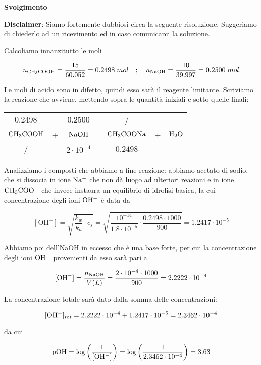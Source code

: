\vspace{0.2cm}\large\textbf{Svolgimento}\normalsize

\vspace{0.2cm}\textbf{Disclaimer}: Siamo fortemente dubbiosi circa la seguente risoluzione. Suggeriamo di chiederlo ad un ricevimento ed in caso comunicarci la soluzione.

\vspace{0.2cm}Calcoliamo innanzitutto le moli

$$n_{\rm CH_3COOH}=\frac{15}{60.052}=0.2498\;mol
\quad;\quad
n_{\rm NaOH}=\frac{10}{39.997}=0.2500\;mol$$

Le moli di acido sono in difetto, quindi esso sarà il reagente limitante. Scriviamo la reazione che avviene, mettendo sopra le quantità iniziali e sotto quelle finali:

\begin{center}
    \begin{tabular}{ccccccc}
        $0.2498$ &  & $0.2500$ & & / &&\\
        $\rm CH_3COOH$ & + & $\rm NaOH$ & \ce{->} & $\rm CH_3COONa$ & + & $\rm H_2O$\\
        / &  & $2 \cdot 10^{-4}$ & & $0.2498$ &&\\
    \end{tabular}
\end{center}

Analizziamo i composti che abbiamo a fine reazione: abbiamo acetato di sodio, che si dissocia in ione $\rm Na^+$ che non dà luogo ad ulteriori reazioni e in ione $\rm CH_3COO^-$ che invece instaura un equilibrio di idrolisi basica, la cui concentrazione degli ioni $\rm OH^-$ è data da

$$[\text{OH}^-]
=\sqrt{\frac{k_w}{k_a}\cdot c_s}
=\sqrt{\frac{10^{-14}}{1.8 \cdot 10^{-5}} \cdot \frac{0.2498 \cdot 1000}{900}}
=1.2417 \cdot 10^{-5}$$

Abbiamo poi dell'NaOH in eccesso che è una base forte, per cui la concentrazione degli ioni $\rm OH^-$ provenienti da esso sarà pari a

$$[\text{OH}^-]=\frac{n_{\rm NaOH}}{V(L)}
=\frac{2 \cdot 10^{-4} \cdot 1000}{900}=2.2222 \cdot 10^{-4}$$

La concentrazione totale sarà dato dalla somma delle concentrazioni:

$$\rm [OH^-]_{\textit{tot}}=2.2222 \cdot 10^{-4} + 1.2417 \cdot 10^{-5}
=2.3462 \cdot 10^{-4}$$

da cui

$$\rm pOH=\log{\left(\frac{1}{[OH^-]}\right)}
=\log{\left(\frac{1}{2.3462 \cdot 10^{-4}}\right)}=3.63$$

